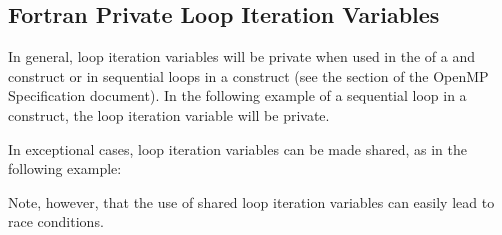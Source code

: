 \begin{fortranspecific}[4ex]
\section{Fortran Private Loop Iteration Variables}
\label{sec:fort_loopvar}

In general, loop iteration variables will be private when used in the 
of a  and  construct or in sequential loops in a
 construct (see the  section of
the OpenMP Specification document). In the following example of a sequential
loop in a  construct, the loop iteration variable  will
be private.
\clearpage


In exceptional cases, loop iteration variables can be made shared, as in the following
example:


Note, however, that the use of shared loop iteration variables can easily lead to
race conditions.
\end{fortranspecific}

